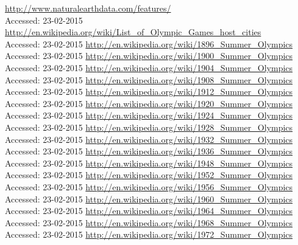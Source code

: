 \documentclass[11pt,a4paper]{article}
\begin{document}
\newpage
\begin{thebibliography}{9}
  \url{http://www.naturalearthdata.com/features/}\\
  {Accessed: 23-02-2015}
  \url{http://en.wikipedia.org/wiki/List_of_Olympic_Games_host_cities}\\
  {Accessed: 23-02-2015}
  \url{http://en.wikipedia.org/wiki/1896_Summer_Olympics}\\
  {Accessed: 23-02-2015}
  \url{http://en.wikipedia.org/wiki/1900_Summer_Olympics}\\
  {Accessed: 23-02-2015}
  \url{http://en.wikipedia.org/wiki/1904_Summer_Olympics}\\
  {Accessed: 23-02-2015}
  \url{http://en.wikipedia.org/wiki/1908_Summer_Olympics}\\
  {Accessed: 23-02-2015}
  \url{http://en.wikipedia.org/wiki/1912_Summer_Olympics}\\
  {Accessed: 23-02-2015}
  \url{http://en.wikipedia.org/wiki/1920_Summer_Olympics}\\
  {Accessed: 23-02-2015}
  \url{http://en.wikipedia.org/wiki/1924_Summer_Olympics}\\
  {Accessed: 23-02-2015}
  \url{http://en.wikipedia.org/wiki/1928_Summer_Olympics}\\
  {Accessed: 23-02-2015}
  \url{http://en.wikipedia.org/wiki/1932_Summer_Olympics}\\
  {Accessed: 23-02-2015}
  \url{http://en.wikipedia.org/wiki/1936_Summer_Olympics}\\
  {Accessed: 23-02-2015}
  \url{http://en.wikipedia.org/wiki/1948_Summer_Olympics}\\
  {Accessed: 23-02-2015}
  \url{http://en.wikipedia.org/wiki/1952_Summer_Olympics}\\
  {Accessed: 23-02-2015}
  \url{http://en.wikipedia.org/wiki/1956_Summer_Olympics}\\
  {Accessed: 23-02-2015}
  \url{http://en.wikipedia.org/wiki/1960_Summer_Olympics}\\
  {Accessed: 23-02-2015}
  \url{http://en.wikipedia.org/wiki/1964_Summer_Olympics}\\
  {Accessed: 23-02-2015}
  \url{http://en.wikipedia.org/wiki/1968_Summer_Olympics}\\
  {Accessed: 23-02-2015}
  \url{http://en.wikipedia.org/wiki/1972_Summer_Olympics}\\

\end{thebibliography}
\end{document}
